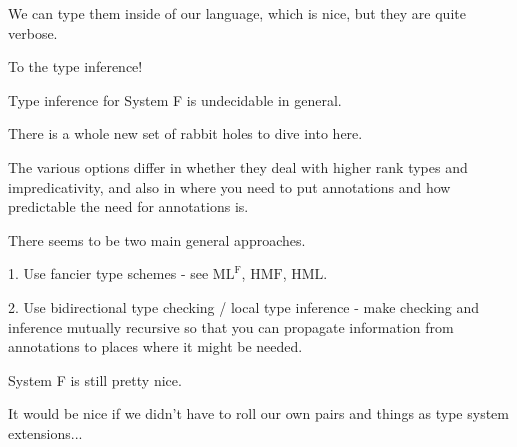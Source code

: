 \begin{frame}
  We can type them inside of our language, which is nice, but they are quite
  verbose.
\end{frame}

\begin{frame}
  To the type inference!
\end{frame}

\begin{frame}
  Type inference for System F is undecidable in general.
\end{frame}

\begin{frame}
  There is a whole new set of rabbit holes to dive into here.
\end{frame}

\begin{frame}
  The various options differ in whether they deal with higher rank types and
  impredicativity, and also in where you need to put annotations and how
  predictable the need for annotations is.
\end{frame}

\begin{frame}
  There seems to be two main general approaches.
\end{frame}

\begin{frame}
  1. Use fancier type schemes - see $\text{ML}^{\text{F}}$, $\text{HMF}$, $\text{HML}$.
\end{frame}

\begin{frame}
  2. Use bidirectional type checking / local type inference - make checking and
  inference mutually recursive so that you can propagate information from
  annotations to places where it might be needed.
\end{frame}

\begin{frame}
  System F is still pretty nice.
\end{frame}

\begin{frame}
  It would be nice if we didn't have to roll our own pairs and things as type
  system extensions...
\end{frame}
